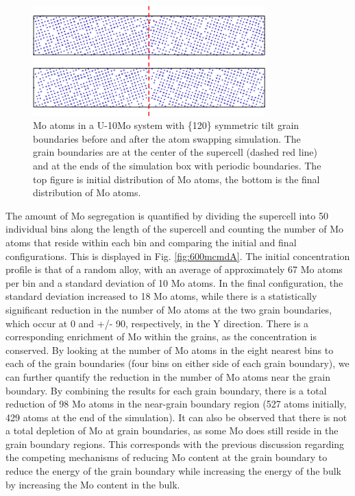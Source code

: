\documentclass[review]{elsarticle}
\begin{document}
\begin{figure}[h]
 \centering
 \includegraphics[width=0.8\textwidth]{600mcmd.png} 
 \caption{Mo atoms in a U-10Mo system with \{120\} symmetric tilt grain boundaries before and after the atom swapping simulation. The grain boundaries are at the center of the supercell (dashed red line) and at the ends of the simulation box with periodic boundaries. The top figure is initial distribution of Mo atoms, the bottom is the final distribution of Mo atoms.}
 \label{fig:600mcmd}
\end{figure}

\FloatBarrier

The amount of Mo segregation is quantified by dividing the supercell into 50 individual bins along the length of the supercell and counting the number of Mo atoms that reside within each bin and comparing the initial and final configurations. This is displayed in Fig. \ref{fig:600mcmdA}. The initial concentration profile is that of a random alloy, with an average of approximately 67 Mo atoms per bin and a standard deviation of 10 Mo atoms. In the final configuration, the standard deviation increased to 18 Mo atoms, while there is a statistically significant reduction in the number of Mo atoms at the two grain boundaries, which occur at 0 and +/- 90, respectively, in the Y direction. There is a corresponding enrichment of Mo within the grains, as the concentration is conserved. By looking at the number of Mo atoms in the eight nearest bins to each of the grain boundaries (four bins on either side of each grain boundary), we can further quantify the reduction in the number of Mo atoms near the grain boundary. By combining the results for each grain boundary, there is a total reduction of 98 Mo atoms in the near-grain boundary region (527 atoms initially, 429 atoms at the end of the simulation). It can also be observed that there is not a total depletion of Mo at grain boundaries, as some Mo does still reside in the grain boundary regions. This corresponds with the previous discussion regarding the competing mechanisms of reducing Mo content at the grain boundary to reduce the energy of the grain boundary while increasing the energy of the bulk by increasing the Mo content in the bulk.
\end{document}
